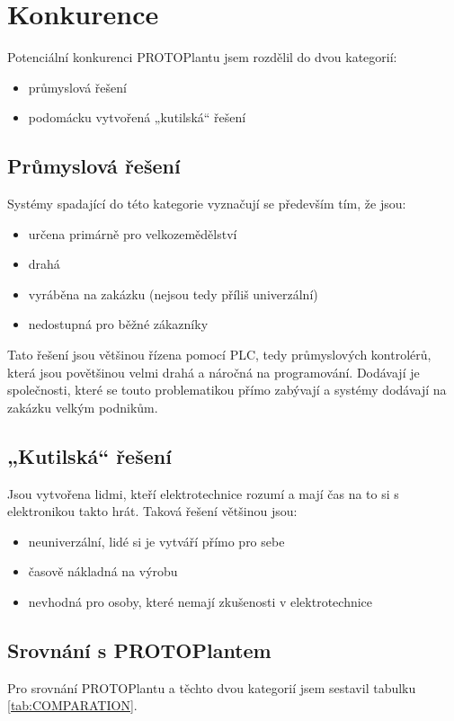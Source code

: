 \chapter{Konkurence}
Potenciální konkurenci PROTOPlantu jsem rozdělil do dvou kategorií:
\begin{itemize}
    \item průmyslová řešení
    \item podomácku vytvořená „kutilská“ řešení
\end{itemize}

\section{Průmyslová řešení}
Systémy spadající do této kategorie vyznačují se především tím, že jsou:
\begin{itemize}
    \item určena primárně pro velkozemědělství
    \item drahá
    \item vyráběna na zakázku (nejsou tedy příliš univerzální)
    \item nedostupná pro běžné zákazníky
\end{itemize}

Tato řešení jsou většinou řízena pomocí PLC, tedy průmyslových kontrolérů, která jsou povětšinou velmi drahá a náročná na programování.
Dodávají je společnosti, které se touto problematikou přímo zabývají a systémy dodávají na zakázku velkým podnikům.

\section{„Kutilská“ řešení}
Jsou vytvořena lidmi, kteří elektrotechnice rozumí a mají čas na to si s elektronikou takto hrát.
Taková řešení většinou jsou:
\begin{itemize}
    \item neuniverzální, lidé si je vytváří přímo pro sebe
    \item časově nákladná na výrobu
    \item nevhodná pro osoby, které nemají zkušenosti v elektrotechnice 
\end{itemize}

\section{Srovnání s PROTOPlantem}
Pro srovnání PROTOPlantu a těchto dvou kategorií jsem sestavil tabulku \ref{tab:COMPARATION}.

